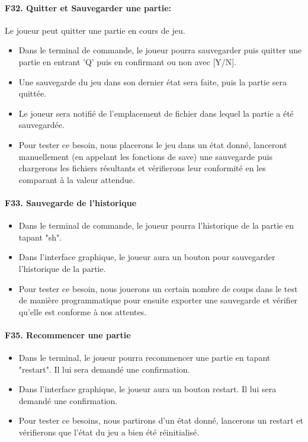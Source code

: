 \documentclass[a4paper,12pt]{article}
\begin{document}
\paragraph{F32. Quitter et Sauvegarder une partie:} Le joueur peut quitter une partie en cours de jeu.
\begin{itemize}
  \item Dans le terminal de commande, le joueur pourra sauvegarder puis quitter une
        partie en entrant 'Q' puis en confirmant ou non avec [Y/N].
  \item Une sauvegarde du jeu dans son dernier état sera faite, puis la partie sera
        quittée.
  \item Le joueur sera notifié de l'emplacement de fichier dans lequel la partie a été
        sauvegardée.
  \item Pour tester ce besoin, nous placerons le jeu dans un état donné, lanceront
        manuellement (en appelant les fonctions de save) une sauvegarde puis chargerons
        les fichiers résultants et vérifierons leur conformité en les comparant à la
        valeur attendue.
\end{itemize}

\paragraph{F33. Sauvegarde de l'historique}
\begin{itemize}
  \item Dans le terminal de commande, le joueur pourra l'historique de la partie en
        tapant "sh".
  \item Dans l'interface graphique, le joueur aura un bouton pour sauvegarder
        l'historique de la partie.
  \item Pour tester ce besoin, nous jouerons un certain nombre de coups dans le test de
        manière programmatique pour ensuite exporter une sauvegarde et vérifier qu'elle
        est conforme à nos attentes.
\end{itemize}

\paragraph{F35. Recommencer une partie}
\begin{itemize}
  \item Dans le terminal, le joueur pourra recommencer une partie en tapant "restart".
        Il lui sera demandé une confirmation.
  \item Dans l'interface graphique, le joueur aura un bouton restart. Il lui sera
        demandé une confirmation.
  \item Pour tester ce besoins, nous partirons d'un état donné, lancerons un restart et
        vérifierons que l'état du jeu a bien été réinitialisé.
\end{itemize}
\end{document}
